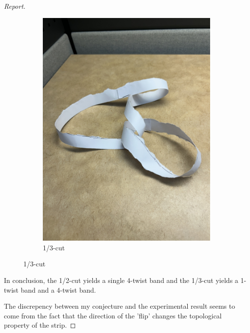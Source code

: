 \documentclass{article}
\begin{document}
\begin{proof}[Report]
\begin{figure}[htp]
\begin{subfigure}[b]{0.45\textwidth}
            \includegraphics[width=\textwidth]{thirdcut.jpg}
            \caption{1/3-cut}
            \label{fig:fig3}
        \end{subfigure}
    \end{figure}

    In conclusion, the 1/2-cut yields a single 4-twist band and 
    the 1/3-cut yields a 1-twist band and a 4-twist band. 
    
    The discrepency between my conjecture and the experimental result 
    seems to come from the fact that the direction of the 'flip' 
    changes the topological property of the strip. 
\end{proof}
\end{document}
